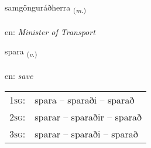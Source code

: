 \documentclass[frontgrid, backgrid]{flacards}\usepackage[]{graphicx}\usepackage[]{xcolor}
\begin{document}
\renewcommand{\flhead}{\vskip5pt \fboxsep=0pt {\small\bfseries\footnotesize Nafnorð | Noun}}
\renewcommand{\fcfoot}{\vskip5pt \fboxsep=0pt \hspace{2pt}{\small\bfseries\footnotesize 3K}}

\renewcommand{\blhead}{\vskip5pt {\small\bfseries\footnotesize Nafnorð | Noun }}
\renewcommand{\bcfoot}{\vskip5pt \hspace{2pt}{\small\bfseries\footnotesize 3K}}


{samgönguráðherra \small{\textsubscript{(\textit{m.})}} \\[1ex] %
\textphonetic{[samkœiŋkʏrauθhɛra]} \\
en: \emph{Minister of Transport} \\  [2ex]
\renewcommand*{\arraystretch}{0.8}
}

\renewcommand{\flhead}{\vskip5pt \fboxsep=0pt {\small\bfseries\footnotesize Sagnorð | Verb}}
\renewcommand{\fcfoot}{\vskip5pt \fboxsep=0pt \hspace{2pt}{\small\bfseries\footnotesize 3K}}

\renewcommand{\blhead}{\vskip5pt {\small\bfseries\footnotesize Sagnorð | Verb }}
\renewcommand{\bcfoot}{\vskip5pt \hspace{2pt}{\small\bfseries\footnotesize 3K}}


{spara \small{\textsubscript{(\textit{v.})}} \\[1ex] %
\textphonetic{[spaːra]} \\
en: \emph{save} \\  [2ex]
\renewcommand*{\arraystretch}{0.8}
\begin{tabular}{p{1cm}l}
\textsc{1sg}: & spara -- sparaði -- sparað \\ 
\textsc{2sg}: & sparar -- sparaðir -- sparað \\ 
\textsc{3sg}: & sparar -- sparaði -- sparað \\ 
\end{tabular}
}
\end{document}

